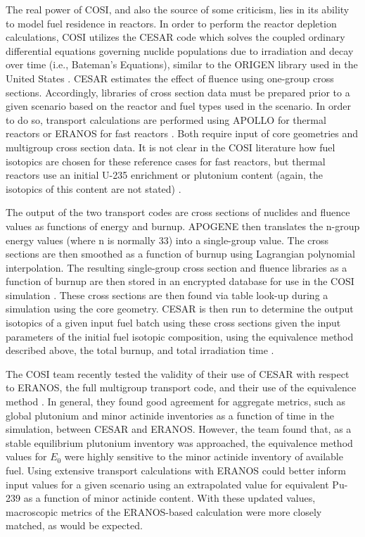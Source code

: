 The real power of COSI, and also the source of some criticism, lies in its
ability to model fuel residence in reactors. In order to perform the reactor
depletion calculations, COSI utilizes the CESAR code \cite{vidal_cesar:_2006}
which solves the coupled ordinary differential equations governing nuclide
populations due to irradiation and decay over time (i.e., Bateman's Equations),
similar to the ORIGEN library used in the United
States \cite{bell_origen_1973}. CESAR estimates the effect of fluence using
one-group cross sections. Accordingly, libraries of cross section data must be
prepared prior to a given scenario based on the reactor and fuel types used in
the scenario. In order to do so, transport calculations are performed using
APOLLO \cite{santamarina_2009_apollo2} for thermal reactors or ERANOS for fast
reactors \cite{ruggieri_2006_eranos}. Both require input of core geometries and
multigroup cross section data. It is not clear in the COSI literature how fuel
isotopics are chosen for these reference cases for fast reactors, but thermal
reactors use an initial U-235 enrichment or plutonium content (again, the
isotopics of this content are not stated) \cite{guerin_benchmark_2009}.

The output of the two transport codes are cross sections of nuclides and fluence
values as functions of energy and burnup. APOGENE then translates the n-group
energy values (where n is normally 33) into a single-group value. The cross
sections are then smoothed as a function of burnup using Lagrangian polynomial
interpolation. The resulting single-group cross section and fluence libraries as
a function of burnup are then stored in an encrypted database for use in the
COSI simulation \cite{atabekjana_2012_analysis}. These cross sections are then
found via table look-up during a simulation using the core geometry. CESAR is
then run to determine the output isotopics of a given input fuel batch using
these cross sections given the input parameters of the initial fuel isotopic
composition, using the equivalence method described above, the total burnup, and
total irradiation time \cite{coquelet-pascal_validation_2011}.

The COSI team recently tested the validity of their use of CESAR with respect to
ERANOS, the full multigroup transport code, and their use of the equivalence
method \cite{coquelet-pascal_validation_2011}. In general, they found good
agreement for aggregate metrics, such as global plutonium and minor actinide
inventories as a function of time in the simulation, between CESAR and
ERANOS. However, the team found that, as a stable equilibrium plutonium
inventory was approached, the equivalence method values for $E_0$ were highly
sensitive to the minor actinide inventory of available fuel. Using extensive
transport calculations with ERANOS could better inform input values for a given
scenario using an extrapolated value for equivalent Pu-239 as a function of
minor actinide content. With these updated values, macroscopic metrics of the
ERANOS-based calculation were more closely matched, as would be expected.
